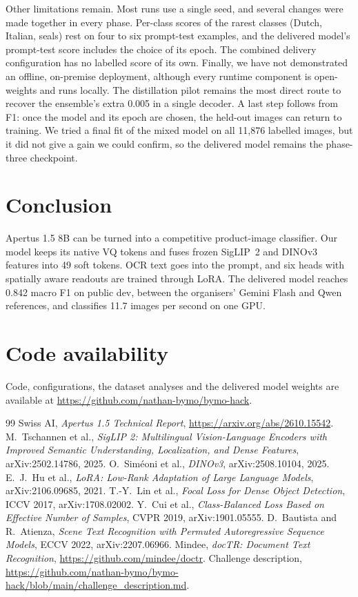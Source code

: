 \documentclass[11pt]{article}
\begin{document}
Other limitations remain. Most runs use a single seed, and several changes were made together in every phase. Per-class scores of the rarest classes (Dutch, Italian, seals) rest on four to six prompt-test examples, and the delivered model's prompt-test score includes the choice of its epoch. The combined delivery configuration has no labelled score of its own. Finally, we have not demonstrated an offline, on-premise deployment, although every runtime component is open-weights and runs locally. The distillation pilot remains the most direct route to recover the ensemble's extra 0.005 in a single decoder. A last step follows from F1: once the model and its epoch are chosen, the held-out images can return to training. We tried a final fit of the mixed model on all 11,876 labelled images, but it did not give a gain we could confirm, so the delivered model remains the phase-three checkpoint.

\section{Conclusion}
Apertus 1.5 8B can be turned into a competitive product-image classifier. Our model keeps its native VQ tokens and fuses frozen SigLIP~2 and DINOv3 features into 49 soft tokens. OCR text goes into the prompt, and six heads with spatially aware readouts are trained through LoRA. The delivered model reaches 0.842 macro F1 on public dev, between the organisers' Gemini Flash and Qwen references, and classifies 11.7 images per second on one GPU.

\section*{Code availability}
Code, configurations, the dataset analyses and the delivered model weights are available at \url{https://github.com/nathan-bymo/bymo-hack}.

\begin{thebibliography}{99}
\sloppy
{} Swiss AI, \emph{Apertus 1.5 Technical Report}, \url{https://arxiv.org/abs/2610.15542}.
 M.~Tschannen et al., \emph{SigLIP 2: Multilingual Vision-Language Encoders with Improved Semantic Understanding, Localization, and Dense Features}, arXiv:2502.14786, 2025.
 O.~Sim\'eoni et al., \emph{DINOv3}, arXiv:2508.10104, 2025.
 E.~J.~Hu et al., \emph{LoRA: Low-Rank Adaptation of Large Language Models}, arXiv:2106.09685, 2021.
 T.-Y.~Lin et al., \emph{Focal Loss for Dense Object Detection}, ICCV 2017, arXiv:1708.02002.
 Y.~Cui et al., \emph{Class-Balanced Loss Based on Effective Number of Samples}, CVPR 2019, arXiv:1901.05555.
 D.~Bautista and R.~Atienza, \emph{Scene Text Recognition with Permuted Autoregressive Sequence Models}, ECCV 2022, arXiv:2207.06966.
 Mindee, \emph{docTR: Document Text Recognition}, \url{https://github.com/mindee/doctr}.
 Challenge description, \url{https://github.com/nathan-bymo/bymo-hack/blob/main/challenge_description.md}.
\end{thebibliography}
\end{document}
